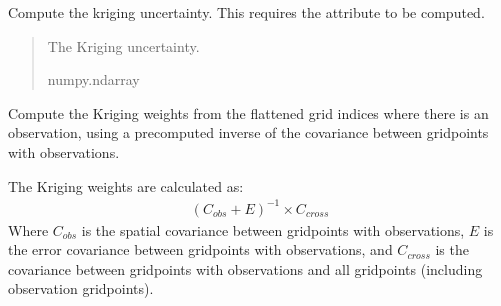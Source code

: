 \documentclass[letterpaper,10pt,english]{sphinxmanual}
\begin{document}
\begin{fulllineitems}
\begin{fulllineitems}
\end{fulllineitems}


\begin{fulllineitems}
\label{\detokenize{kriging:glomar_gridding.stochastic.StochasticKriging.get_uncertainty}}
\pysigstartsignatures
\pysiglinewithargsret
{}
{}
{}
\pysigstopsignatures
\sphinxAtStartPar
Compute the kriging uncertainty. This requires the attribute
 to be computed.
\begin{quote}\begin{description}
\sphinxAtStartPar
{} \textendash{} The Kriging uncertainty.

\sphinxAtStartPar
numpy.ndarray

\end{description}\end{quote}

\end{fulllineitems}


\begin{fulllineitems}
\label{\detokenize{kriging:glomar_gridding.stochastic.StochasticKriging.kriging_weights_from_inverse}}
\pysigstartsignatures
\pysiglinewithargsret
{}
{\sphinxparamcomma {}}
{}
\pysigstopsignatures
\sphinxAtStartPar
Compute the Kriging weights from the flattened grid indices where
there is an observation, using a pre\sphinxhyphen{}computed inverse of the covariance
between grid\sphinxhyphen{}points with observations.

\sphinxAtStartPar
The Kriging weights are calculated as:
\begin{equation*}
\begin{split}(C_{obs} + E)^{-1} \times C_{cross}\end{split}
\end{equation*}
\sphinxAtStartPar
Where \(C_{obs}\) is the spatial covariance between grid\sphinxhyphen{}points
with observations, \(E\) is the error covariance between grid\sphinxhyphen{}points
with observations, and \(C_{cross}\) is the covariance between
grid\sphinxhyphen{}points with observations and all grid\sphinxhyphen{}points (including observation
grid\sphinxhyphen{}points).


\end{fulllineitems}
\end{fulllineitems}
\end{document}

